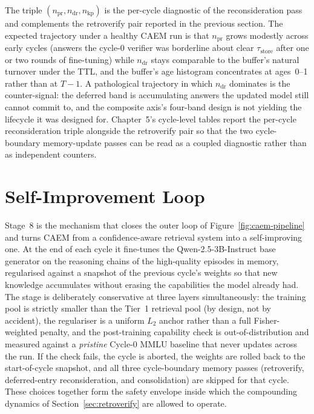 The triple $(n_{\text{pr}}, n_{\text{dr}}, n_{\text{kp}})$ is the per-cycle diagnostic of the reconsideration pass and complements the retroverify pair reported in the previous section. The expected trajectory under a healthy CAEM run is that $n_{\text{pr}}$ grows modestly across early cycles (answers the cycle-0 verifier was borderline about clear $\tau_{\text{store}}$ after one or two rounds of fine-tuning) while $n_{\text{dr}}$ stays comparable to the buffer's natural turnover under the TTL, and the buffer's age histogram concentrates at ages~0--1 rather than at $T-1$. A pathological trajectory in which $n_{\text{dr}}$ dominates is the counter-signal: the deferred band is accumulating answers the updated model still cannot commit to, and the composite axis's four-band design is not yielding the lifecycle it was designed for. Chapter~5's cycle-level tables report the per-cycle reconsideration triple alongside the retroverify pair so that the two cycle-boundary memory-update passes can be read as a coupled diagnostic rather than as independent counters.

\section{Self-Improvement Loop}
\label{sec:self-improvement}

Stage~8 is the mechanism that closes the outer loop of Figure~\ref{fig:caem-pipeline} and turns CAEM from a confidence-aware retrieval system into a self-improving one. At the end of each cycle it fine-tunes the Qwen-2.5-3B-Instruct base generator on the reasoning chains of the high-quality episodes in memory, regularised against a snapshot of the previous cycle's weights so that new knowledge accumulates without erasing the capabilities the model already had. The stage is deliberately conservative at three layers simultaneously: the training pool is strictly smaller than the Tier~1 retrieval pool (by design, not by accident), the regulariser is a uniform $L_{2}$ anchor rather than a full Fisher-weighted penalty, and the post-training capability check is out-of-distribution and measured against a \emph{pristine} Cycle-0 MMLU baseline that never updates across the run. If the check fails, the cycle is aborted, the weights are rolled back to the start-of-cycle snapshot, and all three cycle-boundary memory passes (retroverify, deferred-entry reconsideration, and consolidation) are skipped for that cycle. These choices together form the safety envelope inside which the compounding dynamics of Section~\ref{sec:retroverify} are allowed to operate.

